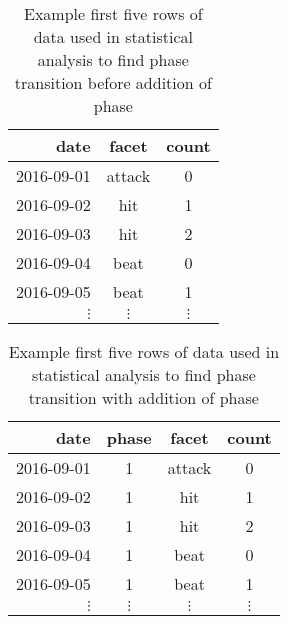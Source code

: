 \begin{table}[ht]
    \centering
    \begin{tabular}{|r|cc|}
        \hline
        date       &   facet    &  count     \\
        \hline
        2016-09-01 &     attack &    0     \\
        2016-09-02 &     hit    &    1     \\
        2016-09-03 &     hit    &    2     \\
        2016-09-04 &     beat   &    0     \\
        2016-09-05 &     beat   &    1     \\
        $\vdots$   &  $\vdots$  & $\vdots$ \\
    \end{tabular}
    \caption{Example first five rows of data used in statistical analysis to find
    phase transition before addition of phase}
    \label{tab:sample-data}
\end{table}

\begin{table}[ht]
    \centering
    \begin{tabular}{|r|ccc|}
        \hline
        date       &  phase  &   facet    &  count     \\
        \hline               
        2016-09-01 &    1    &     attack &    0     \\
        2016-09-02 &    1    &     hit    &    1     \\
        2016-09-03 &    1    &     hit    &    2     \\
        2016-09-04 &    1    &     beat   &    0     \\
        2016-09-05 &    1    &     beat   &    1     \\
        $\vdots$   & $\vdots$&  $\vdots$  & $\vdots$ \\
    \end{tabular}
    \caption{Example first five rows of data used in statistical analysis to find
    phase transition with addition of phase}
    \label{tab:sample-data-wphase}
\end{table}


